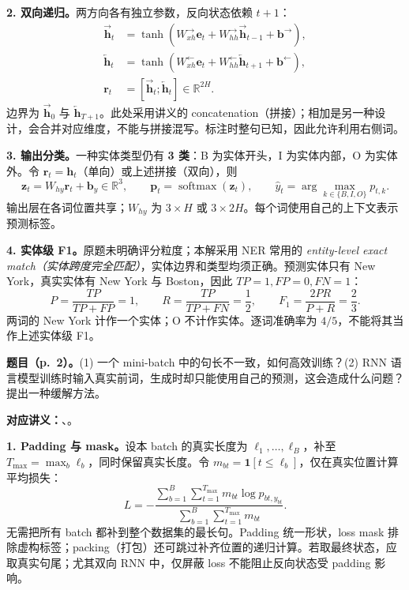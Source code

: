 \textbf{2. 双向递归。}两方向各有独立参数，反向状态依赖 $t+1$：
\begin{align*}
 \overrightarrow{\mathbf h}_t
 &=\tanh(W_{xh}^{\to}\mathbf e_t+W_{hh}^{\to}\overrightarrow{\mathbf h}_{t-1}+\mathbf b^{\to}),\\
 \overleftarrow{\mathbf h}_t
 &=\tanh(W_{xh}^{\leftarrow}\mathbf e_t+W_{hh}^{\leftarrow}\overleftarrow{\mathbf h}_{t+1}+\mathbf b^{\leftarrow}),\\
 \mathbf r_t&=[\overrightarrow{\mathbf h}_t;\overleftarrow{\mathbf h}_t]\in\mathbb R^{2H}.
\end{align*}
边界为 $\overrightarrow{\mathbf h}_0$ 与 $\overleftarrow{\mathbf h}_{T+1}$。此处采用讲义的 concatenation（拼接）；相加是另一种设计，会合并对应维度，不能与拼接混写。标注时整句已知，因此允许利用右侧词。

\textbf{3. 输出分类。}一种实体类型仍有 \textbf{3 类}：B 为实体开头，I 为实体内部，O 为实体外。令 $\mathbf r_t=\mathbf h_t$（单向）或上述拼接（双向），则
\[
 \mathbf z_t=W_{hy}\mathbf r_t+\mathbf b_y\in\mathbb R^3,
 \qquad \mathbf p_t=\operatorname{softmax}(\mathbf z_t),
 \qquad \widehat y_t=\arg\max_{k\in\{B,I,O\}}p_{t,k}.
\]
输出层在各词位置共享；$W_{hy}$ 为 $3\times H$ 或 $3\times2H$。每个词使用自己的上下文表示预测标签。

\textbf{4. 实体级 F1。}原题未明确评分粒度；本解采用 NER 常用的 \emph{entity-level exact match（实体跨度完全匹配）}，实体边界和类型均须正确。预测实体只有 New York，真实实体有 New York 与 Boston，因此 $TP=1,FP=0,FN=1$：
\[
 P=\frac{TP}{TP+FP}=1,\qquad
 R=\frac{TP}{TP+FN}=\frac12,\qquad
 \boxed{F_1=\frac{2PR}{P+R}=\frac23.}
\]
两词的 New York 计作一个实体；O 不计作实体。逐词准确率为 $4/5$，不能将其当作上述实体级 F1。

\nopagebreak[4]
\textbf{题目（p.~2）。}(1) 一个 mini-batch 中的句长不一致，如何高效训练？(2) RNN 语言模型训练时输入真实前词，生成时却只能使用自己的预测，这会造成什么问题？提出一种缓解方法。

\textbf{对应讲义：}、。

\textbf{1. Padding 与 mask。}设本 batch 的真实长度为 $\ell_1,\ldots,\ell_B$，补至 $T_{\max}=\max_b\ell_b$，同时保留真实长度。令 $m_{bt}=\mathbf1[t\leq\ell_b]$，仅在真实位置计算平均损失：
\[
 L=-\frac{\sum_{b=1}^{B}\sum_{t=1}^{T_{\max}}
       m_{bt}\log p_{bt,y_{bt}}}
       {\sum_{b=1}^{B}\sum_{t=1}^{T_{\max}}m_{bt}}.
\]
无需把所有 batch 都补到整个数据集的最长句。Padding 统一形状，loss mask 排除虚构标签；packing（打包）还可跳过补齐位置的递归计算。若取最终状态，应取真实句尾；尤其双向 RNN 中，仅屏蔽 loss 不能阻止反向状态受 padding 影响。

